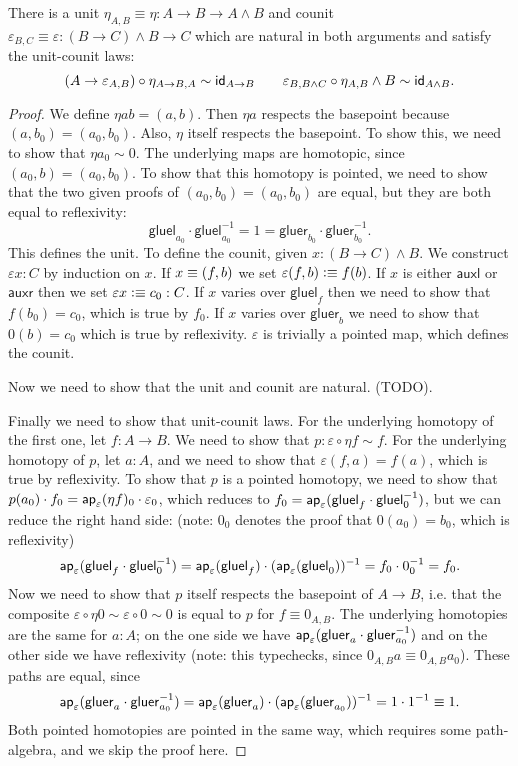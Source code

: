 \documentclass{article}
\newcommand{\pmap}{\to}
\renewcommand{\smash}{\wedge}
\renewcommand{\epsilon}{\varepsilon}
\newcommand{\tr}{\cdot}
\renewcommand{\o}{\ensuremath{\circ}}
\newcommand{\auxl}{\mathsf{auxl}}
\newcommand{\auxr}{\mathsf{auxr}}
\newcommand{\gluel}{\mathsf{gluel}}
\newcommand{\gluer}{\mathsf{gluer}}
\newcommand{\sy}{^{-1}}
\begin{document}
\begin{lem}
  There is a unit $\eta_{A,B}\equiv\eta:A\pmap B\pmap A\smash B$ and counit
  $\epsilon_{B,C}\equiv\epsilon : (B\pmap C)\smash B \pmap C$ which are natural in both arguments
  and satisfy the unit-counit laws:
  $$(A\to\epsilon_{A,B})\o \eta_{A\to B,A}\sim \idfunc[A\to B]\qquad
  \epsilon_{B,B\smash C}\o \eta_{A,B}\smash B\sim\idfunc[A\smash B].$$
  

\end{lem}
\begin{proof}
  We define $\eta ab=(a,b)$. Then $\eta a$ respects the basepoint because
  $(a,b_0)=(a_0,b_0)$. Also, $\eta$ itself respects the basepoint. To show this, we need to show
  that $\eta a_0\sim0$. The underlying maps are homotopic, since $(a_0,b)=(a_0,b_0)$. To show that
  this homotopy is pointed, we need to show that the two given proofs of $(a_0,b_0)=(a_0,b_0)$ are
  equal, but they are both equal to reflexivity:
  $$\gluel_{a_0}\tr\gluel_{a_0}\sy=1=\gluer_{b_0}\tr\gluer_{b_0}\sy.$$
  This defines the unit. To define the counit, given $x:(B\pmap C)\smash B$. We construct
  $\epsilon x:C$ by induction on $x$. If $x\equiv(f,b)$ we set $\epsilon(f,b)\defeq f(b)$. If $x$
  is either $\auxl$ or $\auxr$ then we set $\epsilon x\defeq c_0:C$. If $x$ varies over $\gluel_f$
  then we need to show that $f(b_0)=c_0$, which is true by $f_0$. If $x$ varies over $\gluer_b$ we
  need to show that $0(b)=c_0$ which is true by reflexivity. $\epsilon$ is trivially a pointed map,
  which defines the counit.

  Now we need to show that the unit and counit are natural. (TODO).

  Finally we need to show that unit-counit laws. For the underlying homotopy of the first one, let
  $f:A\to B$. We need to show that $p:\epsilon\o\eta f\sim f$. For the underlying homotopy of $p$,
  let $a:A$, and we need to show that $\epsilon(f,a)=f(a)$, which is true by reflexivity. To show
  that $p$ is a pointed homotopy, we need to show that
  $p(a_0)\tr f_0=\mapfunc{\epsilon}(\eta f)_0\tr \epsilon_0$, which reduces to
  $f_0=\mapfunc{\epsilon}(\gluel_f\tr\gluel_0\sy)$, but we can reduce the right hand side: (note:
  $0_0$ denotes the proof that $0(a_0)=b_0$, which is reflexivity)
  $$\mapfunc{\epsilon}(\gluel_f\tr\gluel_0\sy)=\mapfunc{\epsilon}(\gluel_f)\tr(\mapfunc{\epsilon}(\gluel_0))\sy=f_0\tr 0_0\sy=f_0.$$
  Now we need to show that $p$ itself respects the basepoint of $A\to B$, i.e. that the composite
  $\epsilon\o\eta0\sim\epsilon\o0\sim0$ is equal to $p$ for $f\equiv 0_{A,B}$. The underlying
  homotopies are the same for $a : A$; on the one side we have
  $\mapfunc{\epsilon}(\gluer_{a}\tr\gluer_{a_0}\sy)$ and on the other side we have reflexivity
  (note: this typechecks, since $0_{A,B}a\equiv0_{A,B}a_0$). These paths are equal, since
  $$\mapfunc{\epsilon}(\gluer_{a}\tr\gluer_{a_0}\sy)=\mapfunc{\epsilon}(\gluer_{a})\tr(\mapfunc\epsilon(\gluer_{a_0}))\sy=1\cdot1\sy\equiv1.$$
  Both pointed homotopies are pointed in the same way, which requires some path-algebra, and we skip
  the proof here.


\end{proof}
\end{document}
